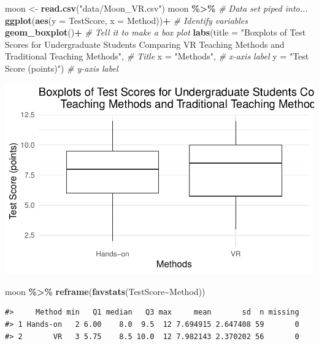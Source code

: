 \documentclass[
]{report}
\newenvironment{Shaded}{\begin{snugshade}}{\end{snugshade}}
\newcommand{\AttributeTok}[1]{\textcolor[rgb]{0.13,0.29,0.53}{#1}}
\newcommand{\CommentTok}[1]{\textcolor[rgb]{0.56,0.35,0.01}{\textit{#1}}}
\newcommand{\FunctionTok}[1]{\textcolor[rgb]{0.13,0.29,0.53}{\textbf{#1}}}
\newcommand{\NormalTok}[1]{#1}
\newcommand{\OtherTok}[1]{\textcolor[rgb]{0.56,0.35,0.01}{#1}}
\newcommand{\SpecialCharTok}[1]{\textcolor[rgb]{0.81,0.36,0.00}{\textbf{#1}}}
\newcommand{\StringTok}[1]{\textcolor[rgb]{0.31,0.60,0.02}{#1}}
\begin{document}
\begin{Shaded}
\begin{Highlighting}[]
\NormalTok{moon }\OtherTok{\textless{}{-}} \FunctionTok{read.csv}\NormalTok{(}\StringTok{"data/Moon\_VR.csv"}\NormalTok{)}
\NormalTok{moon }\SpecialCharTok{\%\textgreater{}\%}  \CommentTok{\# Data set piped into...}
  \FunctionTok{ggplot}\NormalTok{(}\FunctionTok{aes}\NormalTok{(}\AttributeTok{y =}\NormalTok{ TestScore, }\AttributeTok{x =}\NormalTok{ Method))}\SpecialCharTok{+}  \CommentTok{\# Identify variables}
  \FunctionTok{geom\_boxplot}\NormalTok{()}\SpecialCharTok{+}  \CommentTok{\# Tell it to make a box plot}
  \FunctionTok{labs}\NormalTok{(}\AttributeTok{title =} \StringTok{"Boxplots of Test Scores for Undergraduate Students Comparing VR }
\StringTok{       Teaching Methods and Traditional Teaching Methods"}\NormalTok{,  }\CommentTok{\# Title}
       \AttributeTok{x =} \StringTok{"Methods"}\NormalTok{,    }\CommentTok{\# x{-}axis label}
       \AttributeTok{y =} \StringTok{"Test Score (points)"}\NormalTok{)  }\CommentTok{\# y{-}axis label}
\end{Highlighting}
\end{Shaded}

\begin{center}\includegraphics[width=0.7\linewidth]{12-A25-inference-1ofeach-theory_files/figure-latex/unnamed-chunk-1-1} \end{center}

\begin{Shaded}
\begin{Highlighting}[]
\NormalTok{moon }\SpecialCharTok{\%\textgreater{}\%}
  \FunctionTok{reframe}\NormalTok{(}\FunctionTok{favstats}\NormalTok{(TestScore}\SpecialCharTok{\textasciitilde{}}\NormalTok{Method))}
\end{Highlighting}
\end{Shaded}

\begin{verbatim}
#>     Method min   Q1 median   Q3 max     mean       sd  n missing
#> 1 Hands-on   2 6.00    8.0  9.5  12 7.694915 2.647408 59       0
#> 2       VR   3 5.75    8.5 10.0  12 7.982143 2.370202 56       0
\end{verbatim}
\end{document}
